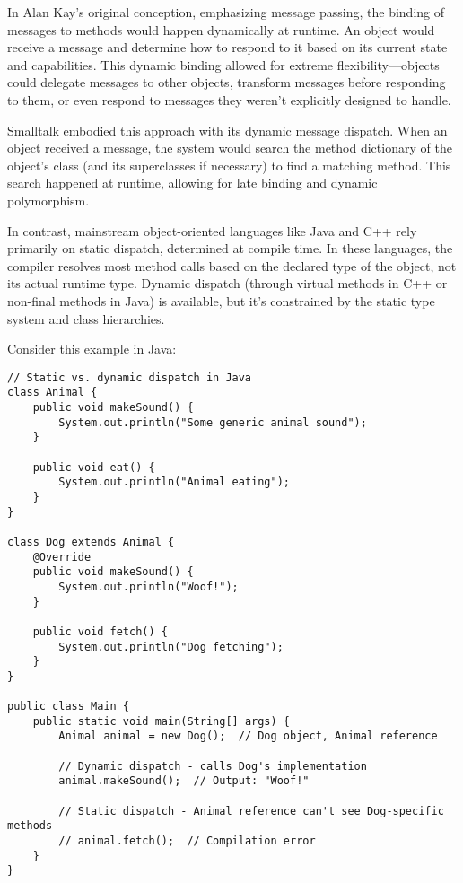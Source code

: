 \documentclass[11pt]{article}
\begin{document}
In Alan Kay's original conception, emphasizing message passing, the binding of messages to methods would happen dynamically at runtime. An object would receive a message and determine how to respond to it based on its current state and capabilities. This dynamic binding allowed for extreme flexibility—objects could delegate messages to other objects, transform messages before responding to them, or even respond to messages they weren't explicitly designed to handle.

Smalltalk embodied this approach with its dynamic message dispatch. When an object received a message, the system would search the method dictionary of the object's class (and its superclasses if necessary) to find a matching method. This search happened at runtime, allowing for late binding and dynamic polymorphism.

In contrast, mainstream object-oriented languages like Java and C++ rely primarily on static dispatch, determined at compile time. In these languages, the compiler resolves most method calls based on the declared type of the object, not its actual runtime type. Dynamic dispatch (through virtual methods in C++ or non-final methods in Java) is available, but it's constrained by the static type system and class hierarchies.

Consider this example in Java:

\begin{verbatim}
// Static vs. dynamic dispatch in Java
class Animal {
    public void makeSound() {
        System.out.println("Some generic animal sound");
    }

    public void eat() {
        System.out.println("Animal eating");
    }
}

class Dog extends Animal {
    @Override
    public void makeSound() {
        System.out.println("Woof!");
    }

    public void fetch() {
        System.out.println("Dog fetching");
    }
}

public class Main {
    public static void main(String[] args) {
        Animal animal = new Dog();  // Dog object, Animal reference

        // Dynamic dispatch - calls Dog's implementation
        animal.makeSound();  // Output: "Woof!"

        // Static dispatch - Animal reference can't see Dog-specific methods
        // animal.fetch();  // Compilation error
    }
}
\end{verbatim}
\end{document}

